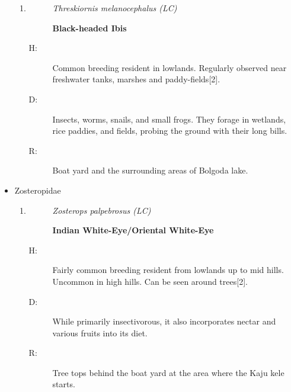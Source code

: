 \begin{itemize}
\begin{enumerate}%
\item%
\begin{description}%
\item[]%
\textit{Threskiornis melanocephalus (LC)}%
\item[]%
\textbf{Black{-}headed Ibis}%
\end{description}%
\begin{description}%
\item[H: ]%
Common breeding resident in lowlands. Regularly observed near freshwater tanks, marshes and paddy-fields{[}2{]}.%
\item[D: ]%
Insects, worms, snails, and small frogs. They forage in wetlands, rice paddies, and fields, probing the ground with their long bills.%
\item[R: ]%
Boat yard and the surrounding areas of Bolgoda lake.%
\end{description}%
\end{enumerate}%
\item%
Zosteropidae%
\begin{enumerate}%
\item%
\begin{description}%
\item[]%
\textit{Zosterops palpebrosus (LC)}%
\item[]%
\textbf{Indian White{-}Eye/Oriental White{-}Eye}%
\end{description}%
\begin{description}%
\item[H: ]%
Fairly common breeding resident from lowlands up to mid hills. Uncommon in high hills. Can be seen around trees{[}2{]}.%
\item[D: ]%
While primarily insectivorous, it also incorporates nectar and various fruits into its diet.%
\item[R: ]%
Tree tops behind the boat yard at the area where the Kaju kele starts.%
\end{description}%
\end{enumerate}%
\end{itemize}
